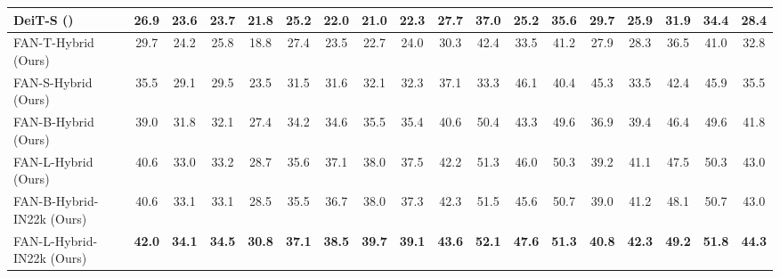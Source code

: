 \documentclass[nohyperref]{article}
\theoremstyle{plain}
\theoremstyle{definition}
\theoremstyle{remark}
\begin{document}
\begin{table*}[h!]
\begin{savenotes}
\begin{minipage*}{1.0\textwidth}
{\begin{tabular}{l|c|cccc|cccc|cccc|cccc}
\multicolumn{1}{l|}{DeiT-S (\citeauthor{touvron2021training})} & \multicolumn{1}{c|}{26.9} & 23.6 & 23.7 &  21.8   & \multicolumn{1}{c|}{25.2} & 22.0 & 21.0 & 22.3 & \multicolumn{1}{c|}{27.7} & 37.0 & 25.2 & 35.6 &  \multicolumn{1}{c|}{ 29.7  }  & {25.9} & 31.9 & 34.4 & {28.4} \\
\midrule
\multicolumn{1}{l|}{FAN-T-Hybrid (Ours)} & \multicolumn{1}{c|}{{29.7}} & {24.2} & {25.8} & {18.8}     & \multicolumn{1}{c|}{{27.4}} & {23.5} & {22.7} & {24.0} & \multicolumn{1}{c|}{{30.3}}  & 42.4 & {33.5} & {41.2} & \multicolumn{1}{c|}{ {27.9}  } & {28.3} & {36.5} & {41.0} & {32.8} \\
\multicolumn{1}{l|}{FAN-S-Hybrid (Ours)} & \multicolumn{1}{c|}{{35.5}} & {29.1} & {29.5} & {23.5}     & \multicolumn{1}{c|}{{31.5}} & {31.6} & {32.1} & {32.3} & \multicolumn{1}{c|}{{37.1}} & {33.3} & {46.1} & {40.4} & \multicolumn{1}{c|}{ {45.3}  } & {33.5} & {42.4} & {45.9} & {35.5} \\
\multicolumn{1}{l|}{FAN-B-Hybrid (Ours)} & \multicolumn{1}{c|}{{39.0}} & {31.8} & {32.1} & {27.4}     & \multicolumn{1}{c|}{{34.2}} & {34.6} & {35.5} & {35.4} & \multicolumn{1}{c|}{{40.6}} & {50.4} & {43.3} & {49.6} & \multicolumn{1}{c|}{ {36.9}  } & {39.4} & {46.4} & {49.6} & {41.8} \\
\multicolumn{1}{l|}{FAN-L-Hybrid (Ours)} & \multicolumn{1}{c|}{{40.6}} & {33.0} & {33.2} & {28.7}     & \multicolumn{1}{c|}{{35.6}} & {37.1} & {38.0} & {37.5} & \multicolumn{1}{c|}{{42.2}} & {51.3} & {46.0} & {50.3} & \multicolumn{1}{c|}{ {39.2}  } & {41.1} & {47.5} & {50.3} & {43.0} \\
\midrule
\multicolumn{1}{l|}{FAN-B-Hybrid-IN22k (Ours)} & \multicolumn{1}{c|}{{40.6}} & {33.1} & {33.1} & {28.5}     & \multicolumn{1}{c|}{{35.5}} & {36.7} & {38.0} & {37.3} & \multicolumn{1}{c|}{{42.3}} & {51.5} & {45.6} & {50.7} & \multicolumn{1}{c|}{ {39.0}  } & {41.2} & {48.1} & {50.7} & {43.0} \\
\multicolumn{1}{l|}{FAN-L-Hybrid-IN22k (Ours)} & \multicolumn{1}{c|}{\textbf{42.0}}  & \textbf{34.1} & \textbf{34.5}     & \multicolumn{1}{c|}{\textbf{30.8}} & \textbf{37.1} & \textbf{38.5} & \textbf{39.7} & \multicolumn{1}{c|}{\textbf{39.1}} & \textbf{43.6} & \textbf{52.1} & \textbf{47.6} &\textbf{51.3} & \multicolumn{1}{c|}{ \textbf{40.8}  } & \textbf{42.3} & \textbf{49.2} & \textbf{51.8} & \textbf{44.3} \\
\end{tabular}
}
\end{minipage*}
\end{savenotes}
\vspace{-1mm}
\end{table*} 
\end{document}
